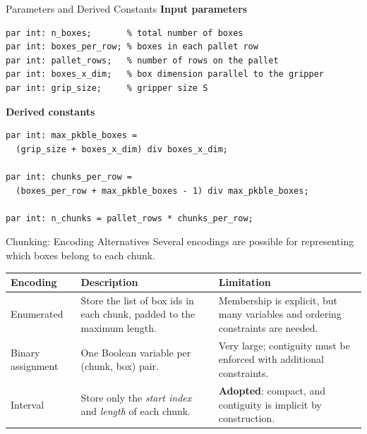 \documentclass[aspectratio=169,xcolor=dvipsnames]{beamer}
\begin{document}

\begin{frame}[fragile]{Parameters and Derived Constants}
    \textbf{Input parameters}
    \begin{lstlisting}
par int: n_boxes;       % total number of boxes
par int: boxes_per_row; % boxes in each pallet row
par int: pallet_rows;   % number of rows on the pallet
par int: boxes_x_dim;   % box dimension parallel to the gripper
par int: grip_size;     % gripper size S
    \end{lstlisting}

    \vspace{0.3cm}
    \textbf{Derived constants}
    \begin{lstlisting}
par int: max_pkble_boxes =
  (grip_size + boxes_x_dim) div boxes_x_dim;

par int: chunks_per_row =
  (boxes_per_row + max_pkble_boxes - 1) div max_pkble_boxes;

par int: n_chunks = pallet_rows * chunks_per_row;
    \end{lstlisting}
\end{frame}


\begin{frame}{Chunking: Encoding Alternatives}
    \small
    Several encodings are possible for representing which boxes belong to each chunk.

    \vspace{0.2cm}
    \begin{tabular}{p{} p{} p{}}
        \toprule
        \textbf{Encoding} & \textbf{Description} & \textbf{Limitation} \\
        \midrule
        Enumerated
        & Store the list of box ids in each chunk, padded to the maximum length.
        & Membership is explicit, but many variables and ordering constraints are needed. \\
        \midrule
        Binary assignment
        & One Boolean variable per (chunk, box) pair.
        & Very large; contiguity must be enforced with additional constraints. \\
        \midrule
        Interval
        & Store only the \emph{start index} and \emph{length} of each chunk.
        & \textbf{Adopted}: compact, and contiguity is implicit by construction. \\
        \bottomrule
    \end{tabular}
\end{frame}
\end{document}
